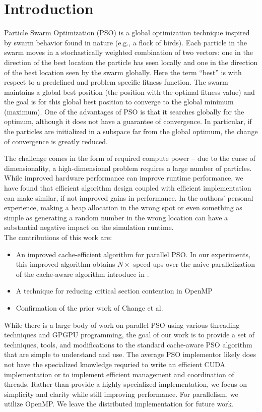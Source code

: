 \section{Introduction}
Particle Swarm Optimization (PSO) \cite{pso} is a global optimization technique
inspired by swarm behavior found in nature (e.g., a flock of birds).
Each particle in the swarm moves in a stochastically weighted
combination of two vectors: one in the direction of the best location the
particle has seen locally and one in the direction of the best location seen by
the swarm globally. Here the term ``best'' is with respect to a predefined and
problem specific fitness function.
The swarm maintains a global best position (the position
with the optimal fitness value) and the goal is for this global best position to
converge to the global minimum (maximum).
One of the advantages of PSO is that it searches globally for the optimum,
although it does not have a guarantee of convergence.
In particular, if the particles are initialized in a subspace far from the
global optimum, the change of convergence is greatly reduced.

The challenge comes in the form of required compute power -- due to
the curse of dimensionality, a high-dimensional problem requires a large number
of particles. While improved hardware performance can
improve runtime performance, we have found that efficient algorithm
design coupled with efficient implementation can make similar, if not improved
gains in performance. In the authors'
personal experience, making a heap allocation in the wrong spot or even
something as simple as generating a random number in the wrong location can
have a substantial negative impact on the simulation runtime.\\
The contributions of this work are:

\begin{itemize}
\item An improved cache-efficient algorithm for parallel PSO. In our
  experiments, this improved algorithm obtains $N\times$ speed-ups over the
  naive parallelization of the cache-aware algorithm introduce in
  \cite{cache-pso}.
\item A technique for reducing critical section contention in OpenMP
\item Confirmation of the prior work of Change et al. \cite{cache-pso}

\end{itemize}

While there is a large body of work on parallel PSO using various threading
techniques and GPGPU programming, the goal of our work is to provide a set
of techniques, tools, and modifications to the standard cache-aware PSO
algorithm that are simple to understand and use.
The average PSO implementor
likely does not have the specialized knowledge requried to write an efficient
CUDA implementation or to implement efficient management and coordination of
threads. Rather than provide a highly specialized implementation, we focus on
simplicity and clarity while still improving performance. For parallelism, we
utilize OpenMP. We leave the distributed implementation for future work.

